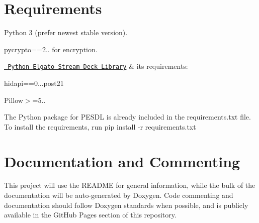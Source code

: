 \section*{Requirements}


\begin{DoxyItemize}
\item Python 3 (prefer newest stable version).
\item pycrypto==2.. for encryption.
\item \href{https://github.com/abcminiuser/python-elgato-streamdeck}{\texttt{ Python Elgato Stream Deck Library}} \& it\textquotesingle{}s requirements\+:
\begin{DoxyItemize}
\item hidapi==0...\+post21
\item Pillow$>$=5..
\end{DoxyItemize}
\end{DoxyItemize}

The Python package for P\+E\+S\+DL is already included in the requirements.\+txt file. To install the requirements, run {\ttfamily pip install -\/r requirements.\+txt}

\section*{Documentation and Commenting}

This project will use the R\+E\+A\+D\+ME for general information, while the bulk of the documentation will be auto-\/generated by Doxygen. Code commenting and documentation should follow Doxygen standards when possible, and is publicly available in the Git\+Hub Pages section of this repository. 
